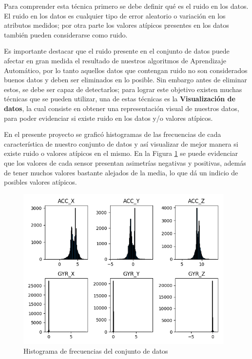 Para comprender esta t\'{e}cnica primero se debe definir qu\'{e} es el ruido en los datos. El ruido en los datos es cualquier tipo de error aleatorio o variaci\'{o}n en los atributos medidos; por otra parte los valores at\'{i}picos presentes en los datos tambi\'{e}n pueden considerarse como ruido. 

\vspace{5mm} %

Es importante destacar que el ruido presente en el conjunto de datos puede afectar en gran medida el resultado de nuestros algoritmos de Aprendizaje Autom\'{a}tico, por lo tanto aquellos datos que contengan ruido no son considerados buenos datos y deben ser eliminados en lo posible. Sin embargo antes de eliminar estos, se debe ser capaz de detectarlos; para lograr este objetivo existen muchas t\'{e}cnicas que se pueden utilizar, una de estas t\'{e}cnicas es la \textbf{Visualizaci\'{o}n de datos}, la cual consiste en obtener una representaci\'{o}n visual de nuestros datos, para poder evidenciar si existe ruido en los datos y/o valores at\'{i}picos.

\vspace{5mm} %

En el presente proyecto se grafic\'{o} histogramas de las frecuencias de cada caracter\'{i}stica de nuestro conjunto de datos y as\'{i} visualizar de mejor manera si existe ruido o valores at\'{i}picos en el mismo. En la Figura \ref{fig:hist} se puede evidenciar que los valores de cada sensor presentan asimetr\'{i}as negativas y positivas, adem\'{a}s de tener muchos valores bastante alejados de la media, lo que d\'{a} un indicio de posibles valores at\'{i}picos.

\begin{figure}[h!]
  \begin{center}	\includegraphics[width=0.97\textwidth,frame]{imagenes/Cap3/histograma_sensores}
  \caption{Histograma de frecuencias del conjunto de datos}
  \label{fig:hist}
  \end{center}
\end{figure}

